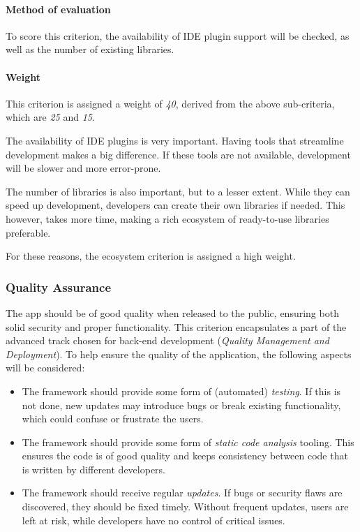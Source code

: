 \paragraph{Method of evaluation}
To score this criterion, the availability of IDE plugin support will be checked, as well as the number of existing libraries.

\paragraph{Weight}
This criterion is assigned a weight of \emph{40}, derived from the above sub-criteria, which are \emph{25} and \emph{15}.

The availability of IDE plugins is very important.
Having tools that streamline development makes a big difference.
If these tools are not available, development will be slower and more error-prone.

The number of libraries is also important, but to a lesser extent.
While they can speed up development, developers can create their own libraries if needed.
This however, takes more time, making a rich ecosystem of ready-to-use libraries preferable.

For these reasons, the ecosystem criterion is assigned a high weight.

\subsubsection{Quality Assurance}\label{subsubsec:quality-assurance}
The app should be of good quality when released to the public, ensuring both solid security and proper functionality.
This criterion encapsulates a part of the advanced track chosen for back-end development (\emph{Quality Management and Deployment}).
To help ensure the quality of the application, the following aspects will be considered:

\begin{itemize}
	\item The framework should provide some form of (automated) \emph{testing}.
	      If this is not done, new updates may introduce bugs or break existing functionality, which could confuse or frustrate the users.
	\item The framework should provide some form of \emph{static code analysis} tooling.
	      This ensures the code is of good quality and keeps consistency between code that is written by different developers.
	\item The framework should receive regular \emph{updates}.
	      If bugs or security flaws are discovered, they should be fixed timely.
	      Without frequent updates, users are left at risk, while developers have no control of critical issues.
\end{itemize}

